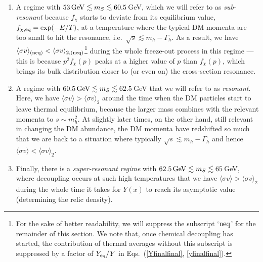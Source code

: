 \documentclass[twocolumn,showpacs,amsmath,amssymb,superscriptaddress,nofootinbib]{revtex4-1}
\begin{document}
\begin{enumerate}
\item A regime with $53\,{\rm GeV}\lesssim m_S\lesssim60.5$\,GeV, which we will refer to 
as {\it sub-resonant } because $f_\chi$ starts to deviate from its equilibrium value, 
$f_{\chi,{\rm eq}}=\exp(-E/T)$, at a temperature where the typical DM momenta are too small
to hit the resonance, i.e.~$\sqrt{s}\lesssim m_h -\Gamma_h$. As a result, we have 
$\langle \sigma v\rangle_{\rm (neq)}<\langle \sigma v\rangle_{2,{\rm (neq)}}$\footnote{%
For the sake of better readability, we will suppress the subscript `{$\rm neq$}' for 
the remainder of this section. We note that, once chemical decoupling has started, 
the contribution of thermal averages without this subscript is suppressed by a
factor of $Y_{\rm eq}/Y$ in Eqs.~(\ref{Yfinalfinal}, \ref{yfinalfinal}).
}
during the whole freeze-out process in this regime --- this is because $p^2f_\chi(p)$ peaks at 
a higher value of $p$ than $f_\chi(p)$, which brings its bulk distribution closer to (or even on) the cross-section resonance. 
\item A regime with $60.5\,{\rm GeV}\lesssim m_S\lesssim62.5$\,GeV that we will refer to 
as {\it resonant}. Here, we have $\langle \sigma v\rangle>\langle \sigma v\rangle_2$ 
around the time when the DM particles start to leave thermal equilibrium, because the larger 
mass combines with the relevant  momenta  to $s\sim m_h^2$. At slightly later times, on the other hand, still 
relevant in changing the DM abundance, the DM momenta have redshifted so much that we 
are back to a situation where typically $\sqrt{s}\lesssim m_h -\Gamma_h$ and 
hence $\langle \sigma v\rangle<\langle \sigma v\rangle_2$.  
\item Finally, there is a {\it super-resonant regime} with $62.5\,{\rm GeV}\lesssim m_S\lesssim65$\,GeV,
where decoupling occurs at such high temperatures that we have 
$\langle \sigma v\rangle>\langle \sigma v\rangle_2$ during the whole time it takes for $Y(x)$ to 
reach its asymptotic value (determining the relic density).
\end{enumerate}
\end{document}
